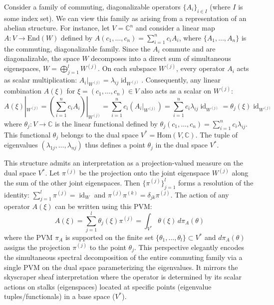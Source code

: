 \begin{remark}
Consider a family of commuting, diagonalizable operators $\{A_i\}_{i \in I}$ (where $I$ is some index set). We can view this family as arising from a representation of an abelian structure. For instance, let $V = \mathbb{C}^n$ and consider a linear map $A: V \to \text{End}(W)$ defined by $A(c_1, \dots, c_n) = \sum_{i=1}^n c_i A_i$, where $\{A_1, \dots, A_n\}$ is the commuting, diagonalizable family. Since the $A_i$ commute and are diagonalizable, the space $W$ decomposes into a direct sum of simultaneous eigenspaces, $W = \bigoplus_{j=1}^{l} W^{(j)}$. On each subspace $W^{(j)}$, every operator $A_i$ acts as scalar multiplication: $A_i|_{W^{(j)}} = \lambda_{ij} \operatorname{id}_{W^{(j)}}$. Consequently, any linear combination $A(\xi)$ for $\xi = (c_1, \dots, c_n) \in V$ also acts as a scalar on $W^{(j)}$:
\[ A(\xi)|_{W^{(j)}} = \left(\sum_{i=1}^n c_i A_i\right)|_{W^{(j)}} = \sum_{i=1}^n c_i (A_i|_{W^{(j)}}) = \sum_{i=1}^n c_i \lambda_{ij} \operatorname{id}_{W^{(j)}} = \theta_j(\xi) \operatorname{id}_{W^{(j)}} \]
where $\theta_j: V \to \mathbb{C}$ is the linear functional defined by $\theta_j(c_1, \dots, c_n) = \sum_{i=1}^n c_i \lambda_{ij}$. This functional $\theta_j$ belongs to the dual space $V^* = \text{Hom}(V, \mathbb{C})$. The tuple of eigenvalues $(\lambda_{1j}, \dots, \lambda_{nj})$ thus defines a point $\theta_j$ in the dual space $V^*$.

This structure admits an interpretation as a projection-valued measure on the dual space $V^*$. Let $\pi^{(j)}$ be the projection onto the joint eigenspace $W^{(j)}$ along the sum of the other joint eigenspaces. Then $\{\pi^{(j)}\}_{j=1}^l$ forms a resolution of the identity: $\sum_{j=1}^l \pi^{(j)} = \operatorname{id}_W$ and $\pi^{(j)}\pi^{(k)} = \delta_{jk}\pi^{(j)}$. The action of any operator $A(\xi)$ can be written using this PVM:
\[ A(\xi) = \sum_{j=1}^l \theta_j(\xi) \pi^{(j)} = \int_{V^*} \theta(\xi) \, d\pi_A(\theta) \]
where the PVM $\pi_A$ is supported on the finite set $\{\theta_1, \dots, \theta_l\} \subset V^*$ and $d\pi_A(\theta)$ assigns the projection $\pi^{(j)}$ to the point $\theta_j$. This perspective elegantly encodes the simultaneous spectral decomposition of the entire commuting family via a single PVM on the dual space parameterizing the eigenvalues. It mirrors the skyscraper sheaf interpretation where the operator is determined by its scalar actions on stalks (eigenspaces) located at specific points (eigenvalue tuples/functionals) in a base space ($V^*$).
\end{remark}

